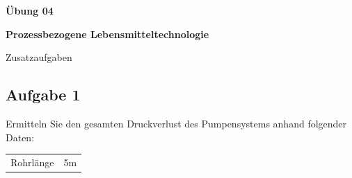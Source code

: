 \documentclass[a4paper,11pt]{article}
\begin{document}


\begin{center}
\LARGE
\color{uniblau}
\textbf{Übung 04} \par \vspace*{2mm}
\large \color{miugray!50!black} \textbf{Prozessbezogene Lebensmitteltechnologie}\par 
\normalsize Zusatzaufgaben
\end{center}
\par 


\color{miudiutex}

\begin{multicols}

\subsection*{Aufgabe 1}
Ermitteln Sie den gesamten Druckverlust des Pumpensystems anhand folgender Daten:
\begin{tabular}{ll}
Rohrlänge & 5m \\
\end{tabular}





\end{multicols}
\end{document}
